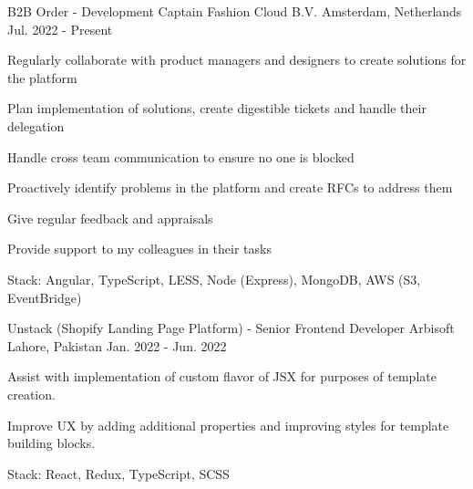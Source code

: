 

\begin{cventries}

  \cventry
    {B2B Order - Development Captain} %
    {Fashion Cloud B.V.} %
    {Amsterdam, Netherlands} %
    {Jul. 2022 - Present} %
    {
      \begin{cvitems} %
        \item {Regularly collaborate with product managers and designers to create solutions for the platform}
        \item {Plan implementation of solutions, create digestible tickets and handle their delegation}
        \item {Handle cross team communication to ensure no one is blocked}
        \item {Proactively identify problems in the platform and create RFCs to address them}
        \item {Give regular feedback and appraisals}
        \item {Provide support to my colleagues in their tasks}
        \item {Stack: Angular, TypeScript, LESS, Node (Express), MongoDB, AWS (S3, EventBridge)}
      \end{cvitems}
    }

  \cventry
    {Unstack (Shopify Landing Page Platform) - Senior Frontend Developer} %
    {Arbisoft} %
    {Lahore, Pakistan} %
    {Jan. 2022 - Jun. 2022} %
    {
      \begin{cvitems} %
        \item {Assist with implementation of custom flavor of JSX for purposes of template creation.}
        \item {Improve UX by adding additional properties and improving styles for template building blocks.}
        \item {Stack: React, Redux, TypeScript, SCSS}
      \end{cvitems}
    }


\end{cventries}
